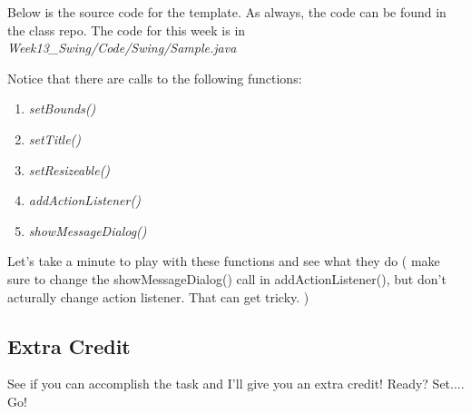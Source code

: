 \documentclass[12pt]{article}
\begin{document}
Below is the source code for the template. As always, the code can be found in
the class repo. The code for this week is in
\textit{Week13\_Swing/Code/Swing/Sample.java}



Notice that there are calls to the following functions:
\begin{enumerate}
\item \textit{setBounds()}
\item \textit{setTitle()}
\item \textit{setResizeable()}
\item \textit{addActionListener()}
\item \textit{showMessageDialog()}
\end{enumerate}

Let's take a minute to play with these functions and see what they do ( make
sure to change the showMessageDialog() call in addActionListener(), but don't
acturally change action listener. That can get tricky. )

\subsection{Extra Credit}
See if you can accomplish the task and I'll give you an extra credit! Ready?
Set.... Go!
\end{document}
